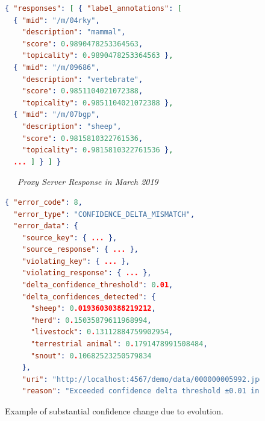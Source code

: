 \begin{figure}
\begin{framed}
\begin{minipage}{\linewidth}
\begin{lstlisting}[language=json]
{ "responses": [ { "label_annotations": [
  { "mid": "/m/04rky",
    "description": "mammal",
    "score": 0.9890478253364563,
    "topicality": 0.9890478253364563 },
  { "mid": "/m/09686",
    "description": "vertebrate",
    "score": 0.9851104021072388,
    "topicality": 0.9851104021072388 },
  { "mid": "/m/07bgp",
    "description": "sheep",
    "score": 0.9815810322761536,
    "topicality": 0.9815810322761536 },
  ... ] } ] }
        \end{lstlisting}
    \end{minipage}
    \begin{minipage}{\linewidth}
        \noindent\xrfill[0.45ex]{.5pt}~~~\textit{Proxy Server Response in March 2019}~~~\xrfill[0.45ex]{.5pt}
        \begin{lstlisting}[language=json]
{ "error_code": 8,
  "error_type": "CONFIDENCE_DELTA_MISMATCH",
  "error_data": {
    "source_key": { ... },
    "source_response": { ... },
    "violating_key": { ... },
    "violating_response": { ... },
    "delta_confidence_threshold": 0.01,
    "delta_confidences_detected": {
      "sheep": 0.01936030388219212,
      "herd": 0.15035879611968994,
      "livestock": 0.13112884759902954,
      "terrestrial animal": 0.1791478991508484,
      "snout": 0.10682523250579834
    },
    "uri": "http://localhost:4567/demo/data/000000005992.jpeg",
    "reason": "Exceeded confidence delta threshold ±0.01 in 5 labels (delta mean=+0.1174)." } }
        \end{lstlisting}
    \end{minipage}
    \end{framed}
    \caption[Architecture response to substantial confidence evolution]{Example of substantial confidence change due to evolution.}
    \label{fig:example-confidence-delta}
\end{figure}
